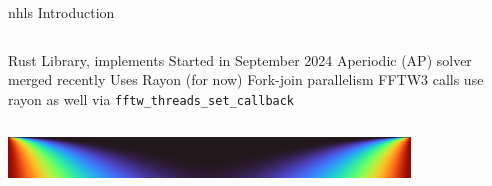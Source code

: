\begin{frame}{nhls Introduction}
  \begin{columns}
  \begin{outline}
    \1 Rust Library, implements \cite{Ahmad2023}
    \1 Started in September 2024
    \1 Aperiodic (AP) solver merged recently
    \1 Uses Rayon (for now)
    \2 Fork-join parallelism
    \2 FFTW3 calls use rayon as well via \lstinline{fftw_threads_set_callback}
  \end{outline}

  \begin{center}
  \centering
  \end{center}
  \end{columns}

  \begin{center}
  \includegraphics[width=0.8\textwidth]{heat_1d_ap.png}
  \end{center}
\end{frame}
